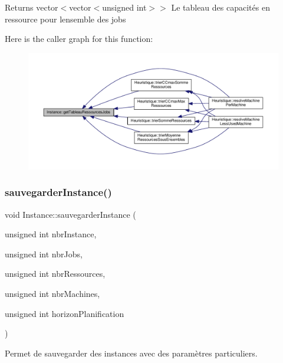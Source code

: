 \begin{DoxyReturn}{Returns}
vector$<$vector$<$unsigned int$>$$>$ Le tableau des capacités en ressource pour l\textquotesingle{}ensemble des jobs 
\end{DoxyReturn}
Here is the caller graph for this function\+:
\nopagebreak
\begin{figure}[H]
\begin{center}
\leavevmode
\includegraphics[width=350pt]{classInstance_ad4124bd2f1edb83a46ef94cfe07eafc8_icgraph}
\end{center}
\end{figure}
\mbox{\label{classInstance_a36e8de8c42d48f16f14f37622dbd3eb1}} 
\subsubsection{\texorpdfstring{sauvegarder\+Instance()}{sauvegarderInstance()}}
{\footnotesize\ttfamily void Instance\+::sauvegarder\+Instance (\begin{DoxyParamCaption}\item[{unsigned int}]{nbr\+Instance,  }\item[{unsigned int}]{nbr\+Jobs,  }\item[{unsigned int}]{nbr\+Ressources,  }\item[{unsigned int}]{nbr\+Machines,  }\item[{unsigned int}]{horizon\+Planification }\end{DoxyParamCaption})}



Permet de sauvegarder des instances avec des paramètres particuliers. 


